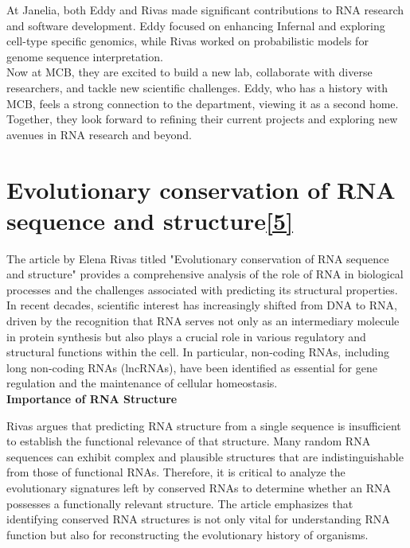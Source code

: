 \documentclass{article}
\begin{document}
\begin{large}
\begin{large}
\begin{large}
At Janelia, both Eddy and Rivas made significant contributions to RNA research and software development. Eddy focused on enhancing Infernal and exploring cell-type specific genomics, while Rivas worked on probabilistic models for genome sequence interpretation.\\[0.5em]

Now at MCB, they are excited to build a new lab, collaborate with diverse researchers, and tackle new scientific challenges. Eddy, who has a history with MCB, feels a strong connection to the department, viewing it as a second home. Together, they look forward to refining their current projects and exploring new avenues in RNA research and beyond.\\[0.5em]

\clearpage

\section{Evolutionary conservation of RNA sequence and structure\href{https://pubmed.ncbi.nlm.nih.gov/33754485/}{\textbf{[5]}}}

The article by Elena Rivas titled "Evolutionary conservation of RNA sequence and structure" provides a comprehensive analysis of the role of RNA in biological processes and the challenges associated with predicting its structural properties. In recent decades, scientific interest has increasingly shifted from DNA to RNA, driven by the recognition that RNA serves not only as an intermediary molecule in protein synthesis but also plays a crucial role in various regulatory and structural functions within the cell. In particular, non-coding RNAs, including long non-coding RNAs (lncRNAs), have been identified as essential for gene regulation and the maintenance of cellular homeostasis.\\[0.5em]

\textbf{Importance of RNA Structure}\par
Rivas argues that predicting RNA structure from a single sequence is insufficient to establish the functional relevance of that structure. Many random RNA sequences can exhibit complex and plausible structures that are indistinguishable from those of functional RNAs. Therefore, it is critical to analyze the evolutionary signatures left by conserved RNAs to determine whether an RNA possesses a functionally relevant structure. The article emphasizes that identifying conserved RNA structures is not only vital for understanding RNA function but also for reconstructing the evolutionary history of organisms.\\[0.5em]


\end{large}
\end{large}
\end{large}
\end{document}
